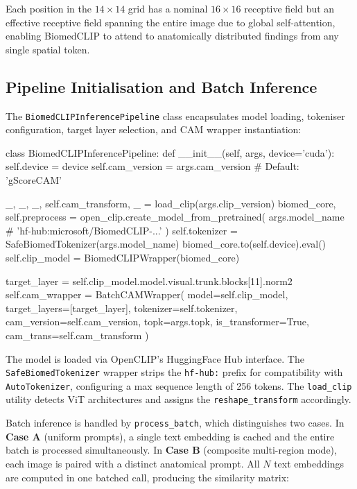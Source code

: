 Each position in the $14 \times 14$ grid has a nominal $16 \times 16$ receptive field but an effective receptive field spanning the entire image due to global self-attention, enabling BiomedCLIP to attend to anatomically distributed findings from any single spatial token.

\subsection{Pipeline Initialisation and Batch Inference}

The \texttt{BiomedCLIPInferencePipeline} class encapsulates model loading, tokeniser configuration, target layer selection, and CAM wrapper instantiation:

\begin{pythoncode}[BiomedCLIPInferencePipeline]
class BiomedCLIPInferencePipeline:
    def __init__(self, args, device='cuda'):
        self.device = device
        self.cam_version = args.cam_version  # Default: 'gScoreCAM'

        _, _, _, self.cam_transform, _ = load_clip(args.clip_version)
        biomed_core, self.preprocess = open_clip.create_model_from_pretrained(
            args.model_name  # 'hf-hub:microsoft/BiomedCLIP-...'
        )
        self.tokenizer = SafeBiomedTokenizer(args.model_name)
        biomed_core.to(self.device).eval()
        self.clip_model = BiomedCLIPWrapper(biomed_core)

        target_layer = self.clip_model.model.visual.trunk.blocks[11].norm2
        self.cam_wrapper = BatchCAMWrapper(
            model=self.clip_model,
            target_layers=[target_layer],
            tokenizer=self.tokenizer,
            cam_version=self.cam_version,
            topk=args.topk,
            is_transformer=True,
            cam_trans=self.cam_transform
        )
\end{pythoncode}

The model is loaded via OpenCLIP's HuggingFace Hub interface. The \texttt{SafeBiomedTokenizer} wrapper strips the \texttt{hf-hub:} prefix for compatibility with \texttt{AutoTokenizer}, configuring a max sequence length of 256 tokens. The \texttt{load\_clip} utility detects ViT architectures and assigns the \texttt{reshape\_transform} accordingly.

Batch inference is handled by \texttt{process\_batch}, which distinguishes two cases. In \textbf{Case A} (uniform prompts), a single text embedding is cached and the entire batch is processed simultaneously. In \textbf{Case B} (composite multi-region mode), each image is paired with a distinct anatomical prompt. All $N$ text embeddings are computed in one batched call, producing the similarity matrix:

